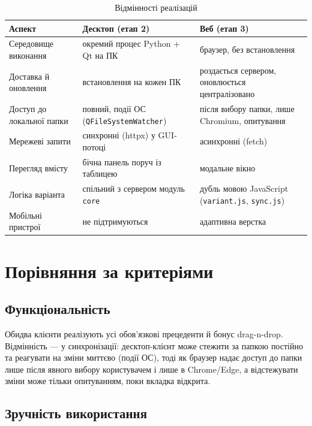 \documentclass[12pt,a4paper]{article}
\begin{document}
{\small
\begin{longtable}{@{}p{4cm}p{6cm}p{6cm}@{}}
\caption{Відмінності реалізацій}\\
\toprule
\textbf{Аспект} & \textbf{Десктоп (етап 2)} & \textbf{Веб (етап 3)} \\
\midrule
\endhead
Середовище виконання & окремий процес Python + Qt на ПК & браузер, без встановлення \\ \midrule
Доставка й оновлення & встановлення на кожен ПК & роздається сервером, оновлюється централізовано \\ \midrule
Доступ до локальної папки & повний, події ОС (\texttt{QFileSystemWatcher}) & після вибору папки, лише Chromium, опитування \\ \midrule
Мережеві запити & синхронні (httpx) у GUI-потоці & асинхронні (fetch) \\ \midrule
Перегляд вмісту & бічна панель поруч із таблицею & модальне вікно \\ \midrule
Логіка варіанта & спільний з сервером модуль \texttt{core} & дубль мовою JavaScript (\texttt{variant.js}, \texttt{sync.js}) \\ \midrule
Мобільні пристрої & не підтримуються & адаптивна верстка \\ \midrule
\bottomrule
\end{longtable}}


\section{Порівняння за критеріями}

\subsection{Функціональність}

Обидва клієнти реалізують усі обов'язкові прецеденти й бонус drag-n-drop. Відмінність --- у синхронізації: десктоп-клієнт може стежити за папкою постійно та реагувати на зміни миттєво (події ОС), тоді як браузер надає доступ до папки лише після явного вибору користувачем і лише в Chrome/Edge, а відстежувати зміни може тільки опитуванням, поки вкладка відкрита.

\subsection{Зручність використання}
\end{document}
